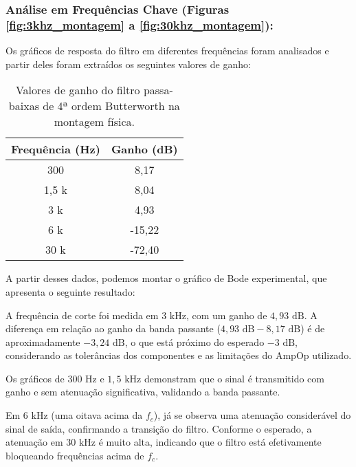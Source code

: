 \subsubsection{Análise em Frequências Chave (Figuras \ref{fig:3khz_montagem} a \ref{fig:30khz_montagem}):}
Os gráficos de resposta do filtro em diferentes frequências foram analisados e partir deles foram extraídos os seguintes valores de ganho:

\begin{table}[H]
\centering
\begin{tabular}{|c|c|}
\hline
\textbf{Frequência (Hz)} & \textbf{Ganho (dB)} \\
\hline
300 & 8,17 \\ \hline
1,5 k & 8,04 \\ \hline
3 k & 4,93 \\ \hline
6 k & -15,22 \\ \hline
30 k & -72,40 \\ \hline
\end{tabular}
\caption{Valores de ganho do filtro passa-baixas de 4ª ordem Butterworth na montagem física.}
\label{tab:ganho_montagem}
\end{table}

A partir desses dados, podemos montar o gráfico de Bode experimental, que apresenta o seguinte resultado:


A frequência de corte foi medida em $3 \text{ kHz}$, com um ganho de $4,93 \text{ dB}$. A diferença em relação ao ganho da banda passante ($4,93 \text{ dB} - 8,17 \text{ dB}$) é de aproximadamente $-3,24 \text{ dB}$, o que está próximo do esperado $-3 \text{ dB}$, considerando as tolerâncias dos componentes e as limitações do AmpOp utilizado.

Os gráficos de $300 \text{ Hz}$ e $1,5 \text{ kHz}$ demonstram que o sinal é transmitido com ganho e sem atenuação significativa, validando a banda passante.

Em $6 \text{ kHz}$ (uma oitava acima da $f_c$), já se observa uma atenuação considerável do sinal de saída, confirmando a transição do filtro. Conforme o esperado, a atenuação em $30 \text{ kHz}$ é muito alta, indicando que o filtro está efetivamente bloqueando frequências acima de $f_c$.

